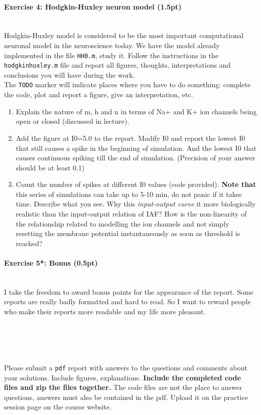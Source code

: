 \documentclass[a4paper,11pt]{article}
\newenvironment{exercise}[3]{\paragraph{Exercise #1: #2 (#3pt)}\ \\}{
\medskip}
\begin{document}
%
%
\begin{exercise}{4}{Hodgkin-Huxley neuron model}{1.5}

Hodgkin-Huxley model is considered to be the most important computational neuronal model in the neuroscience today. We have the model already implemented in the file \texttt{HH0.m}, study it. Follow the instructions in the \texttt{hodgkinhuxley.m} file and report all figures, thoughts, interpretations and conclusions you will have during the work.\\

The \texttt{TODO} marker will indicate places where you have to do something: complete the code, plot and report a figure, give an interpretation, etc.
\begin{enumerate}
\item Explain the nature of m, h and n in terms of Na+ and K+ ion channels being open or closed (discussed in lecture).
\item Add the figure at I0=5.0 to the report. Modify I0 and report the lowest I0 that still causes a spike in the beginning of simulation. And the lowest I0 that causes continuous spiking till the end of simulation. (Precision of your answer should be at least 0.1)
\item Count the number of spikes at different I0 values (code provided). \textbf{Note that} this series of simulations can take up to 5-10 min, do not panic if it takes time. Describe what you see. Why this \textit{input-output curve} it more biologically realistic than the input-output relation of IAF? How is the non-linearity of the relationship related to modelling the ion channels and not simply resetting the membrane potential instantaneously as soon as threshold is reached? 
\end{enumerate}
\end{exercise}


\begin{exercise}{5*}{Bonus}{0.5}
I take the freedom to award bonus points for the appearance of the report. Some reports are really badly formatted and hard to read. So I want to reward people who make their reports more readable and my life more pleasant.
\end{exercise}


\ \\
\ \\
\ \\
\ \\

Please submit a \texttt{pdf} report with answers to the questions and comments about your solutions. Include figures, explanations. \textbf{Include the completed code files and zip the files together.} The code files are not the place to answer questions, answers must also be contained in the pdf. Upload it on the practice session page on the course website.
\end{document}
